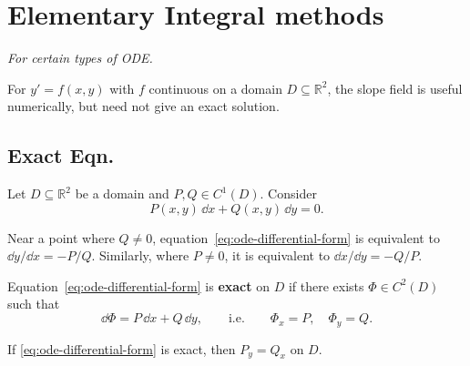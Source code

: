 \chapter{Elementary Integral methods}

\textit{For certain types of ODE.}

\begin{remark*}
For $y'=f(x,y)$ with $f$ continuous on a domain $D\subseteq\mathbb R^2$,
the slope field is useful numerically, but need not give an exact solution.
\end{remark*}

\section{Exact Eqn.}

Let $D\subseteq\mathbb R^2$ be a domain and $P,Q\in C^1(D)$. Consider
\begin{equation}\label{eq:ode-differential-form}
    P(x,y)\,\dd x+Q(x,y)\,\dd y=0.
\end{equation}

\begin{remark}
Near a point where $Q\ne0$, equation~\eqref{eq:ode-differential-form}
is equivalent to $\dd y/\dd x=-P/Q$.
Similarly, where $P\ne0$, it is equivalent to $\dd x/\dd y=-Q/P$.
\end{remark}

\begin{definitionenv}
Equation~\eqref{eq:ode-differential-form} is \textbf{exact} on $D$ if
there exists $\Phi\in C^2(D)$ such that
\[
    \dd\Phi=P\,\dd x+Q\,\dd y,
    \qquad\text{i.e.}\qquad \Phi_x=P,\quad\Phi_y=Q.
\]
\end{definitionenv}

\begin{propositionenv}\label{prop:ode-exact-necessary}
If \eqref{eq:ode-differential-form} is exact, then $P_y=Q_x$ on $D$.
\end{propositionenv}

